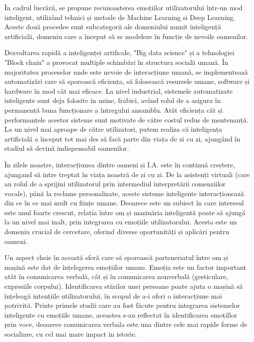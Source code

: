 \documentclass[a4paper, 12pt]{report}
\begin{document}
	În cadrul lucrării, se propune recunoașterea emoțiilor utilizatorului într-un mod inteligent, utilizând tehnici și metode de Machine Learning si Deep Learning. Aceste două procedee sunt subcategorii ale domeniului numit inteligență artificială, domeniu care a început să se modeleze în funcție de nevoile oamenilor.
	
	Dezvoltarea rapidă a inteligenței artificale, "Big data science" și a tehnologiei "Block chain" a provocat multiple schimbări în structura socială umană. În majoritatea proceselor unde este nevoie de interacțiune umană, se implementează automatizări care să sporească eficiența, să folosească resursele umane, software și hardware în mod cât mai eficace. La nivel industrial, sistemele automatizate inteligente sunt deja folosite in uzine, frabici, având rolul de a asigura în permanență buna funcționare a întregului ansamblu. Atât eficiența cât și performanțele acestor sisteme sunt motivate de către costul redus de mentenanță. La un nivel mai aproape de către utilizatori, putem realiza că inteligența artificială a început tot mai des să facă parte din viața de zi cu zi, ajungând în stadiul să devină indispensabil oamenilor.
	
	În zilele noastre, interacțiunea dintre oameni și I.A. este în continuă creștere, ajungand să intre treptat în viața noastră de zi cu zi. De la asistenți virtuali (care au rolul de a sprijini utilizatorul prin intermediul interpretării comenziilor vocale), până la reclame personalizate, aceste sisteme inteligente interacționează din ce în ce mai mult cu ființe umane. Deoarece este un subiect în care interesul este unul foarte crescut, relația între om și mașinăria inteligentă poate să ajungă la un nivel mai inalt, prin integrarea cu emoțiile utilizatorului. Acesta este un domeniu crucial de cercetare, oferind diverse oportunități și aplicări pentru oameni.
	
	Un aspect cheie în această sferă care să sporească parteneriatul între om și mașină este dat de înțelegerea emoțiilor umane. Emoția este un factor important atât în comunicarea verbală, cât și în comunicarea nonverbală (gesticulare, expresiile corpului). Identificarea stărilor unei persoane poate ajuta o mașină să înțeleagă intențiile utilizatorului, în scopul de a-i oferi o interacțiune mai potrivită. Printe primele studii care au fost făcute pentru integrarea sistemelor inteligente cu emoțiile umane, aceastea s-au reflectat în identificarea emoțillor prin voce, deoarece comunicarea verbala este una dintre cele mai rapide forme de socialiare, cu cel mai mare impact in istorie.
	
\end{document}
